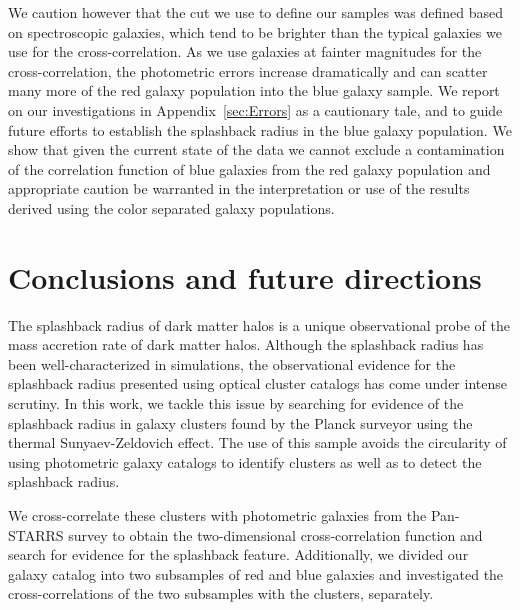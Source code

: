 \documentclass[iop, apjl, twocolappendix, numberedappendix]{emulateapj}
\begin{document}
We caution however that the cut we use to define our samples was
defined based on spectroscopic galaxies, which tend to be brighter
than the typical galaxies we use for the cross-correlation. As we use
galaxies at fainter magnitudes for the cross-correlation, the
photometric errors increase dramatically and can scatter many more of
the red galaxy population into the blue galaxy sample. We report on
our investigations in Appendix~\ref{sec:Errors} as a cautionary tale,
and to guide future efforts to establish the splashback radius in the
blue galaxy population. We show that given the current state of the
data we cannot exclude a contamination of the correlation function of
blue galaxies from the red galaxy population and appropriate caution
be warranted in the interpretation or use of the results derived using
the color separated galaxy populations.


\section{Conclusions and future directions}
\label{sec:Conclusions}
The splashback radius of dark matter halos is a unique observational
probe of the mass accretion rate of dark matter halos. Although the
splashback radius has been well-characterized in simulations, the
observational evidence for the splashback radius presented using
optical cluster catalogs has come under intense scrutiny. In this
work, we tackle this issue by searching for evidence of the
splashback radius in galaxy clusters found by the Planck surveyor using
the thermal Sunyaev-Zeldovich effect. The use of this sample avoids
the circularity of using photometric galaxy catalogs to identify
clusters as well as to detect the splashback radius. 

We cross-correlate these clusters with photometric galaxies from the
Pan-STARRS survey to obtain the two-dimensional cross-correlation
function and search for evidence for the splashback feature.
Additionally, we divided our galaxy catalog into two subsamples of
red and blue galaxies and investigated the cross-correlations of the
two subsamples with the clusters, separately.
\end{document}
